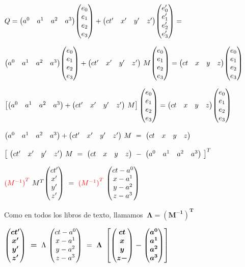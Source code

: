 $Q=\mqty(a^0 & a^1 & a^2 & a^3) \mqty(e_0 \\ e_1 \\ e_2 \\ e_3) +  \mqty(ct' & x' & y' & z') \mqty(e'_0 \\ e'_1 \\ e'_2 \\ e'_3)=$

$\mqty(a^0 & a^1 & a^2 & a^3) \mqty(e_0 \\ e_1 \\ e_2 \\ e_3)+ \mqty(ct' & x' & y' & z') \ M \mqty(e_0 \\ e_1 \\ e_2\\e_3)= \mqty(ct&x&y&z)\mqty(e_0 \\ e_1 \\ e_2 \\ e_3)$


$\left[ \mqty(a^0 & a^1 & a^2 & a^3)+ \mqty(ct' & x' & y' & z')\ M \right] \mqty(e_0 \\ e_1 \\ e_2\\e_3)= \mqty(ct&x&y&z)\mqty(e_0 \\ e_1 \\ e_2 \\ e_3)$

$\mqty(a^0 & a^1 & a^2 & a^3)+ \mqty(ct' & x' & y' & z')\ M\ = \ \mqty(ct&x&y&z)$

$\left[\  \mqty(ct' & x' & y' & z')\ M\  = \ \mqty(ct&x&y&z) \ - \   \mqty(a^0 & a^1 & a^2 & a^3) \ \right]^T$

$\textcolor{red}{({M^{-1})}^T} \ M^T \mqty(ct'\\x'\\y'\\z') \ = \ \textcolor{red}{({M^{-1})}^T} \ \mqty(ct-a^0\\x-a^1\\y-a^2\\z-a^3)$

Como en todos los libros de texto, llamamos $\ \boldsymbol{
\Lambda = (M^{-1})^T  }$


$ \boldsymbol{ \mqty(ct'\\x'\\y'\\z') \ = } \ \Lambda \ \mqty(ct-a^0\\x-a^1\\y-a^2\\z-a^3) \ = 
\ \boldsymbol{ \Lambda \ \left[ 
 \mqty(ct\\x\\y\\z-) -  \mqty(a^0\\a^1\\a^2\\a^3)
\right] }$


